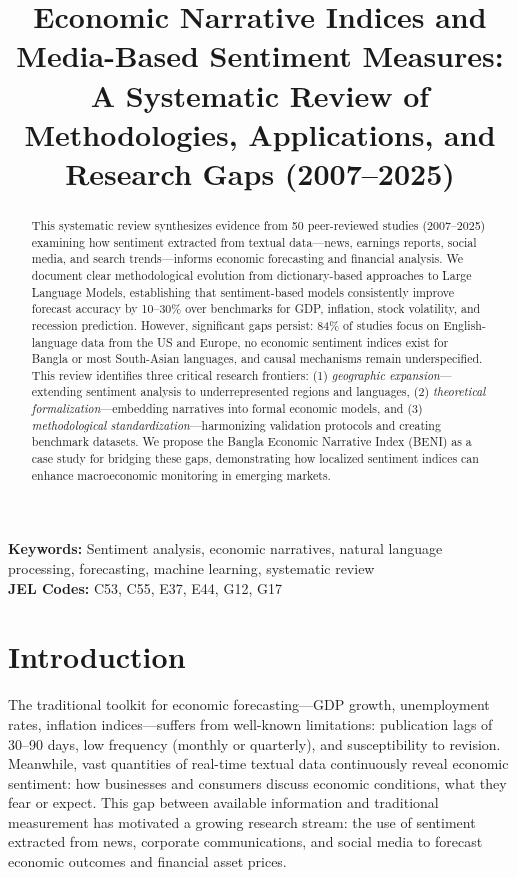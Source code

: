 \documentclass[11pt]{article}
\title{\textbf{Economic Narrative Indices and Media-Based Sentiment Measures:\\
A Systematic Review of Methodologies, Applications, and Research Gaps (2007--2025)}}
\author{} %
\date{}
\begin{document}
\maketitle

\begin{abstract}
This systematic review synthesizes evidence from 50 peer-reviewed studies (2007--2025) examining how sentiment extracted from textual data—news, earnings reports, social media, and search trends—informs economic forecasting and financial analysis. We document clear methodological evolution from dictionary-based approaches to Large Language Models, establishing that sentiment-based models consistently improve forecast accuracy by 10--30\% over benchmarks for GDP, inflation, stock volatility, and recession prediction. However, significant gaps persist: 84\% of studies focus on English-language data from the US and Europe, no economic sentiment indices exist for Bangla or most South-Asian languages, and causal mechanisms remain underspecified. This review identifies three critical research frontiers: (1) \textit{geographic expansion}—extending sentiment analysis to underrepresented regions and languages, (2) \textit{theoretical formalization}—embedding narratives into formal economic models, and (3) \textit{methodological standardization}—harmonizing validation protocols and creating benchmark datasets. We propose the Bangla Economic Narrative Index (BENI) as a case study for bridging these gaps, demonstrating how localized sentiment indices can enhance macroeconomic monitoring in emerging markets.
\end{abstract}

\noindent \textbf{Keywords:} Sentiment analysis, economic narratives, natural language processing, forecasting, machine learning, systematic review \\
\textbf{JEL Codes:} C53, C55, E37, E44, G12, G17

\section{Introduction}

The traditional toolkit for economic forecasting—GDP growth, unemployment rates, inflation indices—suffers from well-known limitations: publication lags of 30--90 days, low frequency (monthly or quarterly), and susceptibility to revision. Meanwhile, vast quantities of real-time textual data continuously reveal economic sentiment: how businesses and consumers discuss economic conditions, what they fear or expect. This gap between available information and traditional measurement has motivated a growing research stream: the use of sentiment extracted from news, corporate communications, and social media to forecast economic outcomes and financial asset prices.
\end{document}
